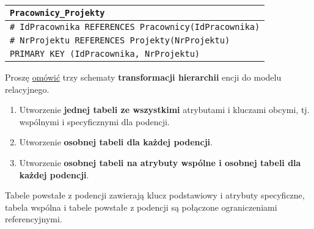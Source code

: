 \begin{center}
    \begin{tabular}{|l|}
        \hline
        \texttt{Pracownicy\_Projekty} \\
        \hline
        \texttt{\#~IdPracownika REFERENCES Pracownicy(IdPracownika)} \\
        \texttt{\#~NrProjektu REFERENCES Projekty(NrProjektu)} \\
        \texttt{PRIMARY KEY (IdPracownika, NrProjektu)}\\
        \hline
    \end{tabular}
\end{center}

\horrule{0.5pt}
Proszę \underline{omówić} trzy schematy \textbf{transformacji hierarchii}
encji do modelu relacyjnego.\\
\horrule{0.5pt}
\begin{enumerate}
    \item Utworzenie \textbf{jednej tabeli ze wszystkimi} atrybutami i
    kluczami obcymi, tj. wspólnymi i specyficznymi dla podencji.
    \item Utworzenie \textbf{osobnej tabeli dla każdej podencji}.
    \item Utworzenie \textbf{osobnej tabeli na atrybuty wspólne i osobnej
    tabeli dla każdej podencji}.
\end{enumerate}
{\small
Tabele powstałe z podencji zawierają klucz podstawiowy i atrybuty
specyficzne, tabela wspólna i tabele powstałe z podencji są
połączone ograniczeniami referencyjnymi.
}
